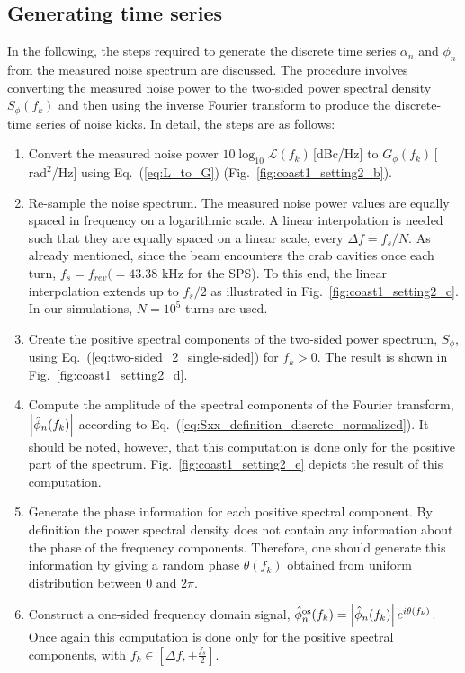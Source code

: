 \subsection{Generating time series}\label{subsec:generatin_noise_kicks}
In the following, the steps required to generate the discrete time series $\alpha_n$ and $\phi_n$ from the measured noise spectrum are discussed. The procedure involves converting the measured noise power to the two-sided power spectral density $S_\phi(f_k)$ and then using the inverse Fourier transform to produce the discrete-time series of noise kicks. In detail, the steps are as follows:

\begin{enumerate}
    \item Convert the measured noise power $10\log_{10}\mathcal{L}(f_k)$\,[dBc/Hz] to $G_\phi(f_k)$\,[$\mathrm{rad^2}$/Hz] using Eq.~(\ref{eq:L_to_G}) (Fig.~\ref{fig:coast1_setting2_b}).
    \item Re-sample the noise spectrum. The measured noise power values are equally spaced in frequency on a logarithmic scale. A linear interpolation is needed such that they are equally spaced on a linear scale, every $\Delta f = f_s/N$. As already mentioned, since the beam encounters the crab cavities once each turn, $f_s=f_{rev}(=43.38$ kHz for the SPS). To this end, the linear interpolation extends up to $f_s/2$ as illustrated in Fig.~\ref{fig:coast1_setting2_c}. In our simulations, $N=10^5$ turns are used.
    \item Create the positive spectral components of the two-sided power spectrum, $S_\phi$, using Eq.~(\ref{eq:two-sided_2_single-sided}) for $f_k>0$. The result is shown in Fig.~\ref{fig:coast1_setting2_d}.
    \item Compute the amplitude of the spectral components of the Fourier transform, $\left | \hat{\phi}_n(f_k) \right | $ according to Eq.~(\ref{eq:Sxx_definition_discrete_normalized}). It should be noted, however, that this computation is done only for the positive part of the spectrum. Fig.~\ref{fig:coast1_setting2_e} depicts the result of this computation. 
    \item Generate the phase information for each positive spectral component. By definition the power spectral density does not contain any information about the phase of the frequency components. Therefore, one should generate this information by giving a random phase $\theta(f_k)$ obtained from uniform distribution between 0 and $2\pi$.
    \item Construct a one-sided frequency domain signal, $\hat{\phi}_n^\mathrm{os}(f_k) =\left| \hat{\phi}_n(f_k) \right| e^{{i} \theta(f_k)}$.  Once again this computation is done only for the positive spectral components, with $f_k \in \left[\Delta f,+\frac{f_s}{2} \right ]$.

\end{enumerate}
